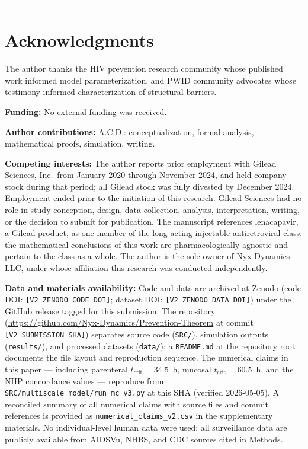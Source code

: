 \documentclass[11pt]{article}
\theoremstyle{definition}
\theoremstyle{remark}
\newcommand{\tcrit}{t_{\text{crit}}}
\begin{document}
\vspace{1em}
\hrule
\vspace{0.5em}

\section*{Acknowledgments}
The author thanks the HIV prevention research community whose published work informed model parameterization, and PWID community advocates whose testimony informed characterization of structural barriers.

\textbf{Funding:} No external funding was received.

\textbf{Author contributions:} A.C.D.: conceptualization, formal analysis, mathematical proofs, simulation, writing.

\textbf{Competing interests:} The author reports prior employment with Gilead Sciences, Inc.\ from January 2020 through November 2024, and held company stock during that period; all Gilead stock was fully divested by December 2024. Employment ended prior to the initiation of this research. Gilead Sciences had no role in study conception, design, data collection, analysis, interpretation, writing, or the decision to submit for publication. The manuscript references lenacapavir, a Gilead product, as one member of the long-acting injectable antiretroviral class; the mathematical conclusions of this work are pharmacologically agnostic and pertain to the class as a whole. The author is the sole owner of Nyx Dynamics LLC, under whose affiliation this research was conducted independently.

\textbf{Data and materials availability:} Code and data are archived at Zenodo (code DOI: \texttt{[V2\_ZENODO\_CODE\_DOI]}; dataset DOI: \texttt{[V2\_ZENODO\_DATA\_DOI]}) under the GitHub release tagged for this submission. The repository (\url{https://github.com/Nyx-Dynamics/Prevention-Theorem} at commit \texttt{[V2\_SUBMISSION\_SHA]}) separates source code (\texttt{SRC/}), simulation outputs (\texttt{results/}), and processed datasets (\texttt{data/}); a \texttt{README.md} at the repository root documents the file layout and reproduction sequence. The numerical claims in this paper --- including parenteral $\tcrit = 34.5$~h, mucosal $\tcrit = 60.5$~h, and the NHP concordance values --- reproduce from \texttt{SRC/multiscale\_model/run\_mc\_v3.py} at this SHA (verified 2026-05-05). A reconciled summary of all numerical claims with source files and commit references is provided as \texttt{numerical\_claims\_v2.csv} in the supplementary materials. No individual-level human data were used; all surveillance data are publicly available from AIDSVu, NHBS, and CDC sources cited in Methods.
\end{document}
